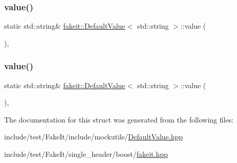 \subsubsection{\texorpdfstring{value()}{value()}\hspace{0.1cm}{\footnotesize\ttfamily [8/9]}}
{\footnotesize\ttfamily static std\+::string\& \mbox{\hyperlink{structfakeit_1_1DefaultValue}{fakeit\+::\+Default\+Value}}$<$ std\+::string $>$\+::value (\begin{DoxyParamCaption}{ }\end{DoxyParamCaption})\hspace{0.3cm}{\ttfamily [inline]}, {\ttfamily [static]}}

\mbox{\label{structfakeit_1_1DefaultValue_3_01std_1_1string_01_4_a01ff9f569a285bde4c2acd3ece6639f7}} 
\subsubsection{\texorpdfstring{value()}{value()}\hspace{0.1cm}{\footnotesize\ttfamily [9/9]}}
{\footnotesize\ttfamily static std\+::string\& \mbox{\hyperlink{structfakeit_1_1DefaultValue}{fakeit\+::\+Default\+Value}}$<$ std\+::string $>$\+::value (\begin{DoxyParamCaption}{ }\end{DoxyParamCaption})\hspace{0.3cm}{\ttfamily [inline]}, {\ttfamily [static]}}



The documentation for this struct was generated from the following files\+:\begin{DoxyCompactItemize}
\item 
include/test/\+Fake\+It/include/mockutils/\mbox{\hyperlink{DefaultValue_8hpp}{Default\+Value.\+hpp}}\item 
include/test/\+Fake\+It/single\+\_\+header/boost/\mbox{\hyperlink{single__header_2boost_2fakeit_8hpp}{fakeit.\+hpp}}\end{DoxyCompactItemize}
